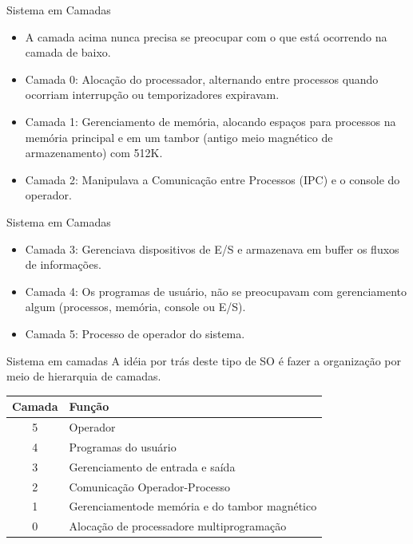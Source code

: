 \documentclass{beamer}
\begin{document}
\begin{frame}{Sistema em Camadas}
    \begin{itemize}
        \item A camada acima nunca precisa se preocupar com o que está ocorrendo na camada de baixo.
        \item Camada 0: Alocação do processador, alternando entre processos quando ocorriam interrupção ou temporizadores expiravam.
        \item Camada 1: Gerenciamento de memória, alocando espaços para processos na memória principal e em um tambor (antigo meio magnético de armazenamento) com 512K.
        \item Camada 2: Manipulava a Comunicação entre Processos (IPC) e o console do operador.
    \end{itemize}
    \begin{frame}{Sistema em Camadas}
    \begin{itemize}
       
        \item Camada 3: Gerenciava dispositivos de E/S e armazenava em buffer os fluxos de informações.
        \item Camada 4: Os programas de usuário, não se preocupavam com gerenciamento algum (processos, memória, console ou E/S).
        \item Camada 5: Processo de operador do sistema.
    \end{itemize}
\end{frame}

\begin{frame}{Sistema em camadas}
    A idéia por trás deste tipo de SO é fazer a organização por meio de hierarquia de camadas.

    \vspace{1cm}

    \begin{table}
        \centering
        \begin{tabular}{|c|l|}
            \hline
            \textbf{Camada} & \textbf{Função}                               \\
            \hline
            5               & Operador                                      \\
            \hline
            4               & Programas do usuário                          \\
            \hline
            3               & Gerenciamento de entrada e saída              \\
            \hline
            2               & Comunicação Operador-Processo                 \\
            \hline
            1               & Gerenciamentode memória e do tambor magnético \\
            \hline
            0               & Alocação de processadore multiprogramação     \\
            \hline
        \end{tabular}
    \end{table}



\end{frame}
\end{frame}
\end{document}
